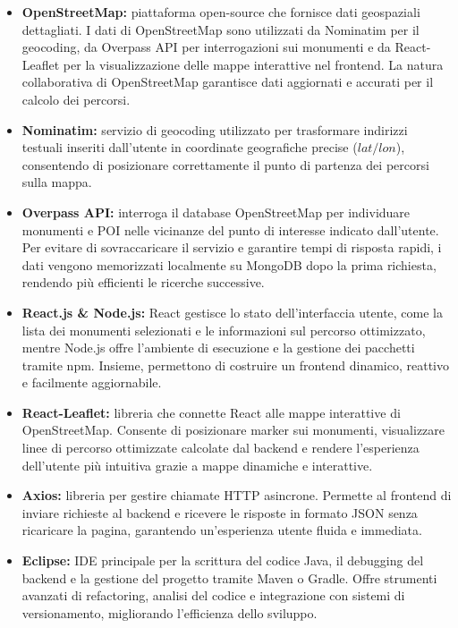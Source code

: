 \begin{itemize}
\item \textbf{OpenStreetMap:} piattaforma open-source che fornisce dati geospaziali dettagliati.
I dati di OpenStreetMap sono utilizzati da Nominatim per il geocoding, da Overpass
API per interrogazioni sui monumenti e da React-Leaflet per la visualizzazione
delle mappe interattive nel frontend. La natura collaborativa di OpenStreetMap
garantisce dati aggiornati e accurati per il calcolo dei percorsi.

\item \textbf{Nominatim:} servizio di geocoding utilizzato per trasformare indirizzi testuali inseriti
dall’utente in coordinate geografiche precise ($lat/lon$), consentendo di posizionare
correttamente il punto di partenza dei percorsi sulla mappa.

\item \textbf{Overpass API:} interroga il database OpenStreetMap per individuare monumenti e
POI nelle vicinanze del punto di interesse indicato dall’utente. Per evitare di sovraccaricare
il servizio e garantire tempi di risposta rapidi, i dati vengono memorizzati
localmente su MongoDB dopo la prima richiesta, rendendo più efficienti le ricerche
successive.

\item \textbf{React.js \& Node.js:} React gestisce lo stato dell’interfaccia utente, come la lista dei
monumenti selezionati e le informazioni sul percorso ottimizzato, mentre Node.js
offre l’ambiente di esecuzione e la gestione dei pacchetti tramite npm. Insieme,
permettono di costruire un frontend dinamico, reattivo e facilmente aggiornabile.

\item \textbf{React-Leaflet:} libreria che connette React alle mappe interattive di OpenStreetMap.
Consente di posizionare marker sui monumenti, visualizzare linee di percorso ottimizzate
calcolate dal backend e rendere l’esperienza dell’utente più intuitiva grazie
a mappe dinamiche e interattive.

\item \textbf{Axios:} libreria per gestire chiamate HTTP asincrone. Permette al frontend di inviare
richieste al backend e ricevere le risposte in formato JSON senza ricaricare la pagina,
garantendo un’esperienza utente fluida e immediata.

\item \textbf{Eclipse:} IDE principale per la scrittura del codice Java, il debugging del backend e
la gestione del progetto tramite Maven o Gradle. Offre strumenti avanzati di refactoring,
analisi del codice e integrazione con sistemi di versionamento, migliorando
l’efficienza dello sviluppo.


\end{itemize}

